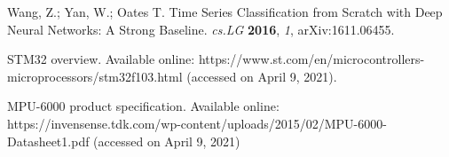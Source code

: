 \documentclass[sport,article,submit,moreauthors,pdftex]{Definitions/mdpi}
\begin{document}
\begin{thebibliography}{999}
Wang, Z.; Yan, W.; Oates T. Time Series Classification from Scratch with Deep Neural Networks: A Strong Baseline. {\em cs.LG} {\bf 2016}, {\em 1},  arXiv:1611.06455.

STM32 overview. Available online: https://www.st.com/en/microcontrollers-microprocessors/stm32f103.html (accessed on April 9, 2021).

MPU-6000 product specification. Available online: https://invensense.tdk.com/wp-content/uploads/2015/02/MPU-6000-Datasheet1.pdf (accessed on April 9, 2021)

\end{thebibliography}

\end{document}
